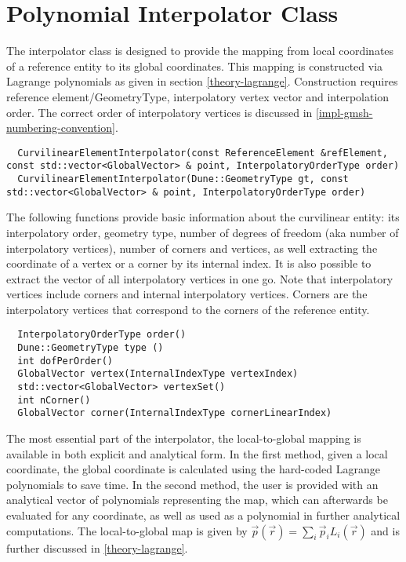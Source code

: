 \section{Polynomial Interpolator Class}
\label{interface-interpolator}

The interpolator class is designed to provide the mapping from local coordinates of a reference entity to its global coordinates. This mapping is constructed via Lagrange polynomials as given in section \ref{theory-lagrange}. Construction requires reference element/GeometryType, interpolatory vertex vector and interpolation order.  The correct order of interpolatory vertices is discussed in \ref{impl-gmsh-numbering-convention}. \\

\begin{mybox}
\begin{lstlisting}
  CurvilinearElementInterpolator(const ReferenceElement &refElement, const std::vector<GlobalVector> & point, InterpolatoryOrderType order)
  CurvilinearElementInterpolator(Dune::GeometryType gt, const std::vector<GlobalVector> & point, InterpolatoryOrderType order)
\end{lstlisting}
\end{mybox}

\noindent
The following functions provide basic information about the curvilinear entity: its interpolatory order, geometry type, number of degrees of freedom (aka number of interpolatory vertices), number of corners and vertices, as well extracting the coordinate of a vertex or a corner by its internal index. It is also possible to extract the vector of all interpolatory vertices in one go. Note that interpolatory vertices include corners and internal interpolatory vertices. Corners are the interpolatory vertices that correspond to the corners of the reference entity. \\

\begin{mybox}
\begin{lstlisting}
  InterpolatoryOrderType order()
  Dune::GeometryType type ()
  int dofPerOrder()
  GlobalVector vertex(InternalIndexType vertexIndex)
  std::vector<GlobalVector> vertexSet()
  int nCorner()
  GlobalVector corner(InternalIndexType cornerLinearIndex)
\end{lstlisting}
\end{mybox}

\noindent
The most essential part of the interpolator, the local-to-global mapping is available in both explicit and analytical form. In the first method, given a local coordinate, the global coordinate is calculated using the hard-coded Lagrange polynomials to save time. In the second method, the user is provided with an analytical vector of polynomials representing the map, which can afterwards be evaluated for any coordinate, as well as used as a polynomial in further analytical computations. The local-to-global map is given by $\vec{p}(\vec{r}) = \sum_i \vec{p}_i L_i (\vec{r})$ and is further discussed in \ref{theory-lagrange}. \\

